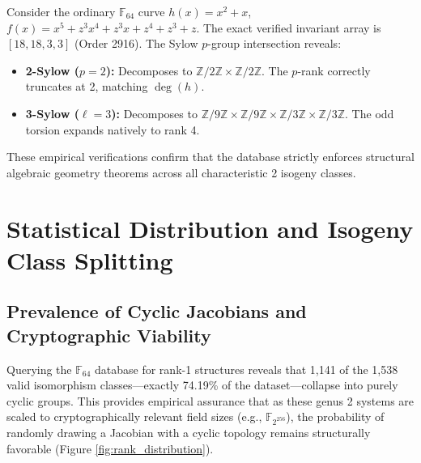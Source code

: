 \documentclass[letterpaper, 11pt]{article}
\begin{document}
Consider the ordinary $\mathbb{F}_{64}$ curve $h(x) = x^2 + x$, $f(x) = x^5 + z^3x^4 + z^3x + z^4 + z^3 + z$. The exact verified invariant array is $[18, 18, 3, 3]$ (Order 2916). The Sylow $p$-group intersection reveals:
\begin{itemize}
    \item \textbf{2-Sylow ($p=2$):} Decomposes to $\mathbb{Z}/2\mathbb{Z} \times \mathbb{Z}/2\mathbb{Z}$. The $p$-rank correctly truncates at 2, matching $\deg(h)$.
    \item \textbf{3-Sylow ($\ell = 3$):} Decomposes to $\mathbb{Z}/9\mathbb{Z} \times \mathbb{Z}/9\mathbb{Z} \times \mathbb{Z}/3\mathbb{Z} \times \mathbb{Z}/3\mathbb{Z}$. The odd torsion expands natively to rank 4.
\end{itemize}
These empirical verifications confirm that the database strictly enforces structural algebraic geometry theorems across all characteristic 2 isogeny classes.

\section{Statistical Distribution and Isogeny Class Splitting}

\subsection{Prevalence of Cyclic Jacobians and Cryptographic Viability}
Querying the $\mathbb{F}_{64}$ database for rank-1 structures reveals that 1,141 of the 1,538 valid isomorphism classes---exactly 74.19\% of the dataset---collapse into purely cyclic groups. This provides empirical assurance that as these genus 2 systems are scaled to cryptographically relevant field sizes (e.g., $\mathbb{F}_{2^{256}}$), the probability of randomly drawing a Jacobian with a cyclic topology remains structurally favorable (Figure \ref{fig:rank_distribution}).
\end{document}
